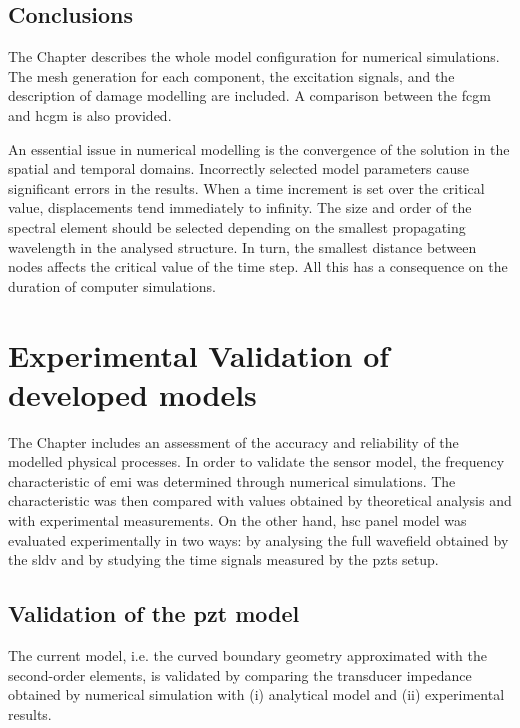 \documentclass[11pt,a4paper,final]{report}
\theoremstyle{plain}
\begin{document}
\section{Conclusions}
\label{sec:conclusionsSimul}

The Chapter describes the whole model configuration for numerical simulations.
The mesh generation for each component, the excitation signals, and the description of damage modelling are included.
A comparison between the \ac{fcgm} and \ac{hcgm} is also provided.

An essential issue in numerical modelling is the convergence of the solution in the spatial and temporal domains.
Incorrectly selected model parameters cause significant errors in the results.
When a time increment is set over the critical value, displacements tend immediately to infinity.
The size and order of the spectral element should be selected depending on the smallest propagating wavelength in the analysed structure.
In turn, the smallest distance between nodes affects the critical value of the time step.
All this has a consequence on the duration of computer simulations.\clearpage{}
\clearpage{}

\chapter{Experimental Validation of developed models}
\label{ch:validation}

The Chapter includes an assessment of the accuracy and reliability of the modelled physical processes.
In order to validate the sensor model, the frequency characteristic of \ac{emi} was determined through numerical simulations.
The characteristic was then compared with values obtained by theoretical analysis and with experimental measurements.
On the other hand, \ac{hsc} panel model was evaluated experimentally in two ways: by analysing the full wavefield obtained by the \ac{sldv} and by studying the time signals measured by the \acp{pzt} setup.
\section{Validation of the \acl{pzt} model}
\label{sec:pztVal}

The current model, i.e. the curved boundary geometry approximated with the second-order elements, is validated by comparing the transducer impedance obtained by numerical simulation with (i) analytical model and (ii) experimental results.
\end{document}
